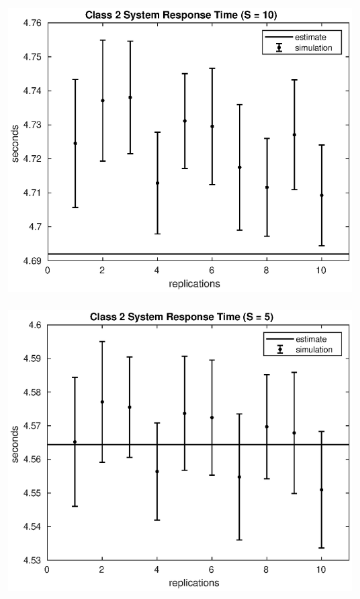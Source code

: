 \begin{frame}
\begin{figure}[!h]
\begin{subfigure}[t]{0.49\textwidth}
\label{15_s2}
\end{subfigure}
%
\begin{subfigure}[t]{0.49\textwidth}
\includegraphics[width=\textwidth]{../figures/simul/10_500K_s2}
\label{10_s2}
\end{subfigure}
%
\begin{subfigure}[t]{0.49\textwidth}
\includegraphics[width=\textwidth]{../figures/simul/5_500K_s2}
\label{5_s2}
\end{subfigure}
%
\label{plot:s2}
\end{figure}
%
%
\end{frame}
